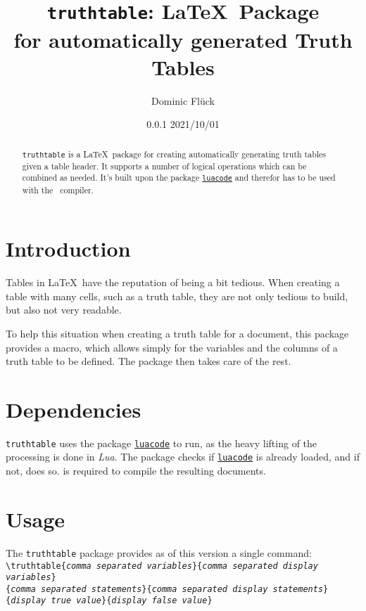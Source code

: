 \documentclass[a4paper]{article}
\title{\texttt{truthtable}\textbf{: \LaTeX\ Package\\for automatically generated Truth Tables}}
\author{Dominic Flück}
\date{0.0.1 2021/10/01}
\begin{document}
	\maketitle

	\begin{abstract}
		\noindent \texttt{truthtable} is a \LaTeX\ package for creating automatically generating truth tables given a table header. It supports a number of logical operations which can be combined as needed. It's built upon the package \href{https://ctan.org/pkg/luacode}{\texttt{luacode}} and therefor has to be used with the \LuaLaTeX\ compiler.
	\end{abstract}

	\tableofcontents

	\section{Introduction}
	Tables in \LaTeX\ have the reputation of being a bit tedious. When creating a table with many cells, such as a truth table, they are not only tedious to build, but also not very readable.

	To help this situation when creating a truth table for a document, this package provides a macro, which allows simply for the variables and the columns of a truth table to be defined. The package then takes care of the rest.

	\section{Dependencies}

	\texttt{truthtable} uses the package \href{https://ctan.org/pkg/luacode}{\texttt{luacode}} to run, as the heavy lifting of the processing is done in \emph{Lua}. 	The package checks if \href{https://ctan.org/pkg/luacode}{\texttt{luacode}} is already loaded, and if not, does so. \LuaLaTeX is required to compile the resulting documents.	

	\section{Usage}

	The \texttt{truthtable} package provides as of this version a single command:\\ \texttt{\textbackslash truthtable\{\emph{comma separated variables}\}\{\emph{comma separated display variables}\}\\\{\emph{comma separated statements}\}\{\emph{comma separated display statements}\}\\\{\emph{display true value}\}\{\emph{display false value}\}}
\end{document}

